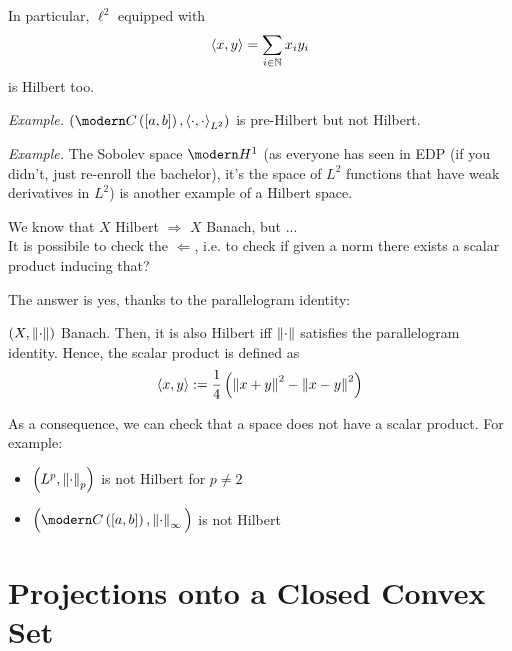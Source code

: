 In particular, $\ell^2$ equipped with
\begin{equation*}
\left\langle x,y \right\rangle=\sum_{i\in\mathbb{N}}x_i y_i
\end{equation*}
is Hilbert too.

\textit{Example.}
$\left( \Cc\left( [a,b] \right),\sca{\cdot,\cdot}_{L^2} \right)$ is pre-Hilbert but not Hilbert.

\textit{Example.}
The Sobolev space $\Hc^1$ (as everyone has seen in EDP (if you didn't, just re-enroll the bachelor), it's the space of $L^2$ functions that have weak derivatives in $L^2$) is another example of a Hilbert space.

\bigskip
\bigskip

We know that $X$ Hilbert $\Longrightarrow$ $X$ Banach, but ... \\
 It is possibile to check the $\Longleftarrow$, i.e. to check if given a norm there exists a scalar product inducing that?

\smallskip

The answer is yes, thanks to the parallelogram identity:

\begin{proposition}
$\left( X,\left\lVert \cdot \right\rVert \right)$ Banach. Then, it is also Hilbert iff $\left\lVert \cdot \right\rVert$ satisfies the parallelogram identity. Hence, the scalar product is defined as
\begin{equation*}
    \left\langle x,y \right\rangle:=\frac{1}{4}\left( \left\lVert x+y \right\rVert^2-\left\lVert x-y \right\rVert^2 \right)
\end{equation*}
\end{proposition}

As a consequence, we can check that a space does not have a scalar product. For example:
\begin{itemize}
    \item $\left( L^p,\left\lVert \cdot \right\rVert_p \right)$ is not Hilbert for $p\neq 2$
    \item $\Big( \Cc\left( [a,b] \right),\norm{\cdot}_\infty \Big)$ is not Hilbert
\end{itemize}


\section{Projections onto a Closed Convex Set} %
\label{sec:projections_onto_a_closed_convex_set}

